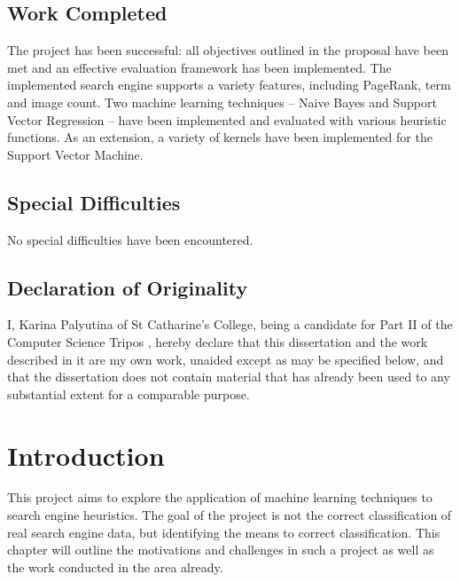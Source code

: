 \documentclass[12pt,notitlepage,twoside]{scrbook}
\begin{document}
\section*{Work Completed}
The project has been successful: all objectives outlined in the proposal have been met and
an effective evaluation framework has been implemented. The implemented search engine
supports a variety features, including PageRank, term and image count. Two machine learning techniques --
Naive Bayes and Support Vector Regression -- have been implemented and evaluated with
various heuristic functions. As an extension, a variety of kernels have been implemented
for the Support Vector Machine.

\section*{Special Difficulties}
No special difficulties have been encountered.

\pagebreak
\section*{Declaration of Originality}

I, Karina Palyutina of St Catharine's College, being a candidate for Part II of the Computer
Science Tripos , hereby declare
that this dissertation and the work described in it are my own work,
unaided except as may be specified below, and that the dissertation
does not contain material that has already been used to any substantial
extent for a comparable purpose.

\bigskip
{}

\medskip
{}


\tableofcontents




\setcounter{page}{1}
\pagestyle{headings}

\chapter{Introduction}
This project aims to explore the application of machine learning techniques to search
engine heuristics. The goal of the project is not the correct classification of real
search engine data, but identifying the means to correct classification. This chapter will
outline the motivations and challenges in such a project as well as the work conducted in
the area already.
\end{document}
